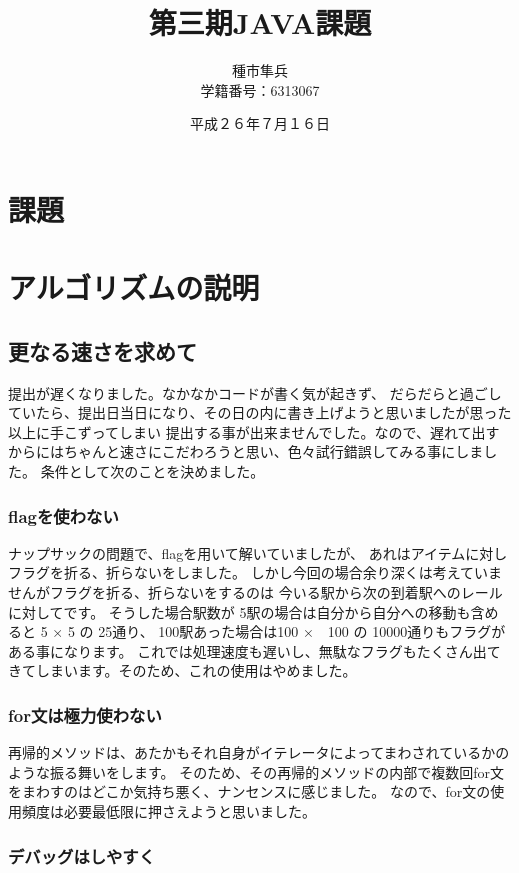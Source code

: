 \documentclass[titlepage]{jarticle}
\title{第三期JAVA課題}
\author{種市隼兵\\学籍番号：6313067}
\date{平成２６年７月１６日}
\begin{document}
\maketitle

\section{課題}

\section{アルゴリズムの説明}
\subsection{更なる速さを求めて}
提出が遅くなりました。なかなかコードが書く気が起きず、
だらだらと過ごしていたら、提出日当日になり、その日の内に書き上げようと思いましたが思った以上に手こずってしまい
提出する事が出来ませんでした。なので、遅れて出すからにはちゃんと速さにこだわろうと思い、色々試行錯誤してみる事にしました。
条件として次のことを決めました。

\subsubsection{flagを使わない}
ナップサックの問題で、flagを用いて解いていましたが、
あれはアイテムに対しフラグを折る、折らないをしました。
しかし今回の場合余り深くは考えていませんがフラグを折る、折らないをするのは
今いる駅から次の到着駅へのレールに対してです。
そうした場合駅数が 5駅の場合は自分から自分への移動も含めると 5 × 5 の 25通り、
100駅あった場合は100 ×　100 の 10000通りもフラグがある事になります。
これでは処理速度も遅いし、無駄なフラグもたくさん出てきてしまいます。そのため、これの使用はやめました。

\subsubsection{for文は極力使わない}

再帰的メソッドは、あたかもそれ自身がイテレータによってまわされているかのような振る舞いをします。
そのため、その再帰的メソッドの内部で複数回for文をまわすのはどこか気持ち悪く、ナンセンスに感じました。
なので、for文の使用頻度は必要最低限に押さえようと思いました。

\subsubsection{デバッグはしやすく}
\end{document}
